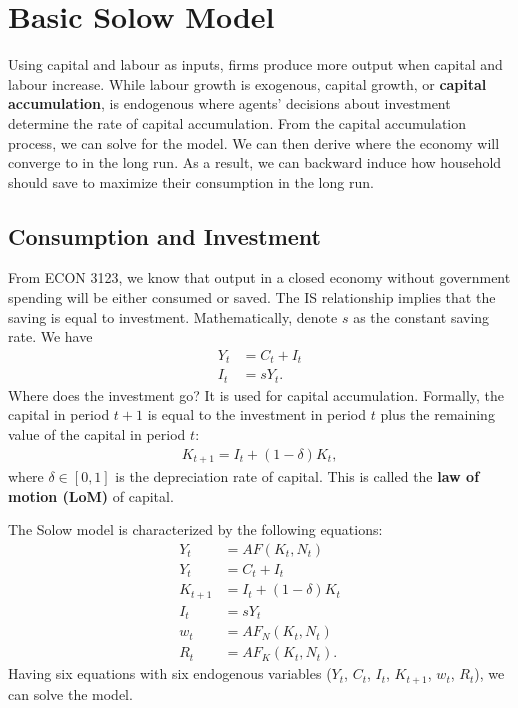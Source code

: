 \documentclass{book}
\theoremstyle{definition}
\theoremstyle{plain}
\begin{document}
\medskip

\section{Basic Solow Model}
Using capital and labour as inputs, firms produce more output when capital and labour increase. While labour growth is exogenous, capital growth, or \textbf{capital accumulation}, is endogenous where agents' decisions about investment determine the rate of capital accumulation. From the capital accumulation process, we can solve for the model. We can then derive where the economy will converge to in the long run. As a result, we can backward induce how household should save to maximize their consumption in the long run.


\subsection{Consumption and Investment}
From ECON 3123, we know that output in a closed economy without government spending will be either consumed or saved. The IS relationship implies that the saving is equal to investment. Mathematically, denote $s$ as the constant saving rate. We have
\begin{align*}
    Y_t &= C_t + I_t \\
    I_t &= s Y_t.
\end{align*}
Where does the investment go? It is used for capital accumulation. Formally, the capital in period $t+1$ is equal to the investment in period $t$ plus the remaining value of the capital in period $t$:
\begin{align*}
    K_{t+1} = I_t + (1-\delta)K_t,
\end{align*}
where $\delta \in [0,1]$ is the depreciation rate of capital. This is called the \textbf{law of motion (LoM)} of capital.

The Solow model is characterized by the following equations:
\begin{align}
    Y_t &= AF(K_t, N_t) \label{eq:solow_prod_func} \\
    Y_t &= C_t + I_t \label{eq:solow_aggregate} \\
    K_{t+1} &= I_t + (1-\delta) K_t \label{eq:solow_lom_agg_capital} \\
    I_t &= s Y_t \label{eq:solow_is} \\
    w_t &= A F_N(K_t, N_t) \label{eq:solow_real_wage} \\
    R_t &= A F_K(K_t, N_t). \label{eq:solow_real_retrun_capital}
\end{align}
Having six equations with six endogenous variables ($Y_t$, $C_t$, $I_t$, {\color{red}$K_{t+1}$}, $w_t$, $R_t$), we can solve the model.
\end{document}
